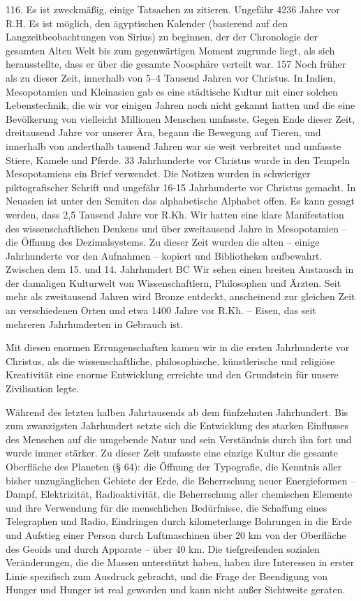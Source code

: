 \documentclass[11pt,a4paper]{book}
\begin{document}
116. Es ist zweckmäßig, einige Tatsachen zu zitieren. Ungefähr 4236 Jahre vor R.H. Es ist möglich, den ägyptischen Kalender (basierend auf den Langzeitbeobachtungen von Sirius) zu beginnen, der der Chronologie der gesamten Alten Welt bis zum gegenwärtigen Moment zugrunde liegt, als sich herausstellte, dass er über die gesamte Noosphäre verteilt war. 157 Noch früher als zu dieser Zeit, innerhalb von 5–4 Tausend Jahren vor Christus. In Indien, Mesopotamien und Kleinasien gab es eine städtische Kultur mit einer solchen Lebenstechnik, die wir vor einigen Jahren noch nicht gekannt hatten und die eine Bevölkerung von vielleicht Millionen Menschen umfasste. Gegen Ende dieser Zeit, dreitausend Jahre vor unserer Ära, begann die Bewegung auf Tieren, und innerhalb von anderthalb tausend Jahren war sie weit verbreitet und umfasste Stiere, Kamele und Pferde. 33 Jahrhunderte vor Christus wurde in den Tempeln Mesopotamiens ein Brief verwendet. Die Notizen wurden in schwieriger piktografischer Schrift und ungefähr 16-15 Jahrhunderte vor Christus gemacht. In Neuasien ist unter den Semiten das alphabetische Alphabet offen. Es kann gesagt werden, dass 2,5 Tausend Jahre vor R.Kh. Wir hatten eine klare Manifestation des wissenschaftlichen Denkens und über zweitausend Jahre in Mesopotamien -- die Öffnung des Dezimalsystems. Zu dieser Zeit wurden die alten -- einige Jahrhunderte vor den Aufnahmen -- kopiert und Bibliotheken aufbewahrt. Zwischen dem 15. und 14. Jahrhundert BC Wir sehen einen breiten Austausch in der damaligen Kulturwelt von Wissenschaftlern, Philosophen und Ärzten. Seit mehr als zweitausend Jahren wird Bronze entdeckt, anscheinend zur gleichen Zeit an verschiedenen Orten und etwa 1400 Jahre vor R.Kh. -- Eisen, das seit mehreren Jahrhunderten in Gebrauch ist.



Mit diesen enormen Errungenschaften kamen wir in die ersten Jahrhunderte vor Christus, als die wissenschaftliche, philosophische, künstlerische und religiöse Kreativität eine enorme Entwicklung erreichte und den Grundstein für unsere Zivilisation legte.



Während des letzten halben Jahrtausends ab dem fünfzehnten Jahrhundert. Bis zum zwanzigsten Jahrhundert setzte sich die Entwicklung des starken Einflusses des Menschen auf die umgebende Natur und sein Verständnis durch ihn fort und wurde immer stärker. Zu dieser Zeit umfasste eine einzige Kultur die gesamte Oberfläche des Planeten (§ 64): die Öffnung der Typografie, die Kenntnis aller bisher unzugänglichen Gebiete der Erde, die Beherrschung neuer Energieformen -- Dampf, Elektrizität, Radioaktivität, die Beherrschung aller chemischen Elemente und ihre Verwendung für die menschlichen Bedürfnisse, die Schaffung eines Telegraphen und Radio, Eindringen durch kilometerlange Bohrungen in die Erde und Aufstieg einer Person durch Luftmaschinen über 20 km von der Oberfläche des Geoids und durch Apparate -- über 40 km. Die tiefgreifenden sozialen Veränderungen, die die Massen unterstützt haben, haben ihre Interessen in erster Linie spezifisch zum Ausdruck gebracht, und die Frage der Beendigung von Hunger und Hunger ist real geworden und kann nicht außer Sichtweite geraten.
\end{document}
